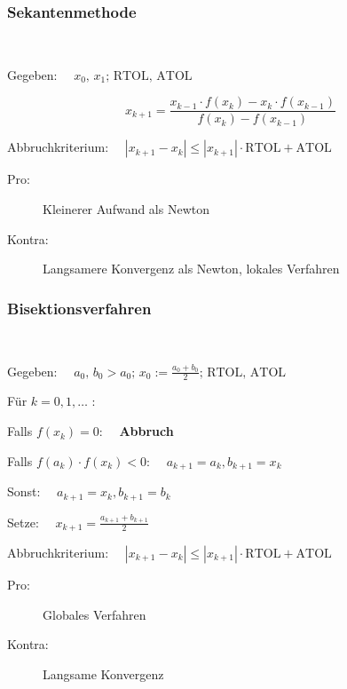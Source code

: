 		\subsubsection{Sekantenmethode}
			\begin{algo} ~
				
				Gegeben: $\quad x_0,\, x_1 ;\, \mathrm{RTOL},\, \mathrm{ATOL}$
				
				\[
					x_{k+1} = \frac{x_{k-1}\cdot f(x_k) - x_k \cdot f(x_{k-1})}{f(x_k) - f(x_{k-1})}
				\]
				
				Abbruchkriterium: $\quad|x_{k+1} - x_k| \leq |x_{k+1}|\cdot \mathrm{RTOL} + \mathrm{ATOL}$
				\begin{description}
					\item[Pro:] Kleinerer Aufwand als Newton
					\item[Kontra:] Langsamere Konvergenz als Newton, lokales Verfahren
				\end{description}
			\end{algo}

		\subsubsection{Bisektionsverfahren}
			\begin{algo} ~
				
				Gegeben: $\quad a_0,\, b_0 > a_0;\, x_0 := \frac{a_0 + b_0}{2};\, \mathrm{RTOL},\, \mathrm{ATOL}$
				
				Für $k=0,1,\dots$ :
				\begin{tightenumerate}
					\item Falls $f(x_k) = 0$: $\quad$\textbf{Abbruch}
					\item Falls $f(a_k)\cdot f(x_k) < 0$:
						$\quad
							a_{k+1}= a_k , b_{k+1} = x_k
						$
					\item Sonst:
						$\quad
							a_{k+1} = x_k, b_{k+1} = b_k
						$
					\item Setze:
						$\quad\displaystyle
							x_{k+1} = \frac{a_{k+1} + b_{k+1}}{2}
						$
				\end{tightenumerate}
				Abbruchkriterium: $\quad|x_{k+1} - x_k| \leq |x_{k+1}|\cdot \mathrm{RTOL} + \mathrm{ATOL}$
				\begin{description}
					\item[Pro:] Globales Verfahren
					\item[Kontra:] Langsame Konvergenz
				\end{description}
			\end{algo}

